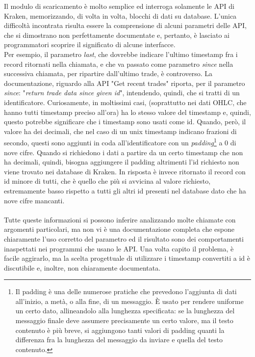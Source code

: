 \documentclass[a4paper,12pt]{report}
\begin{document}
Il modulo di scaricamento è molto semplice ed interroga solamente le API di Kraken, memorizzando, di volta in volta, blocchi di dati su database. L'unica difficoltà incontrata risulta essere la comprensione di alcuni parametri delle API, che si dimostrano non perfettamente documentate e, pertanto, è lasciato ai programmatori scoprire il significato di alcune interfacce.\\ %
Per esempio, il parametro \textit{last}, che dovrebbe indicare l'ultimo timestamp fra i record ritornati nella chiamata, e che va passato come parametro \textit{since} nella successiva chiamata, per ripartire dall'ultimo trade, è controverso. La documentazione, riguardo alla API "Get recent trades" riporta, per il parametro \textit{since}: "\textit{return trade data since given id}", intendendo, quindi, che si tratti di un identificatore. Curiosamente, in moltissimi casi, (soprattutto nei dati OHLC, che hanno tutti timestamp preciso all'ora) ha lo stesso valore del timestamp e, quindi, questo potrebbe significare che i timestamp sono usati come id. Quando, però, il valore ha dei decimali, che nel caso di un unix timestamp indicano frazioni di secondo, questi sono aggiunti in coda all'identificatore con un \textit{padding}\footnote{Il padding è una delle numerose pratiche che prevedono l'aggiunta di dati all'inizio, a metà, o alla fine, di un messaggio. È usato per rendere uniforme un certo dato, allineandolo alla lunghezza specificata: se la lunghezza del messaggio finale deve assumere precisamente un certo valore, ma il testo contenuto è più breve, si aggiungono tanti valori di padding quanti la differenza fra la lunghezza del messaggio da inviare e quella del testo contenuto.} a 0 di nove cifre. Quando si richiedono i dati a partire da un certo timestamp che non ha decimali, quindi, bisogna aggiungere il padding altrimenti l'id richiesto non viene trovato nei database di Kraken. In risposta è invece ritornato %
 il record con id minore di tutti, che è quello che più si avvicina al valore richiesto, estremamente basso rispetto a tutti gli altri id presenti nel database dato che ha nove cifre mancanti.\\~\\
Tutte queste informazioni si possono inferire analizzando molte chiamate con argomenti particolari, ma non vi è una documentazione completa che espone chiaramente l'uso corretto del parametro ed il risultato sono dei comportamenti inaspettati nei programmi che usano le API. Una volta capito il problema, è facile aggirarlo, ma la scelta progettuale di utilizzare i timestamp convertiti a id è discutibile e, inoltre, non chiaramente documentata.
\end{document}

